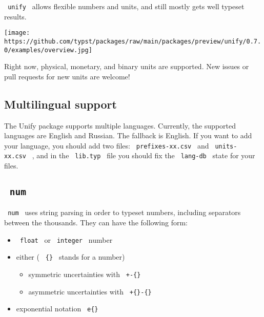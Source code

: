 \texttt{\ unify\ } allows flexible numbers and units, and still mostly
gets well typeset results.

\begin{Shaded}
\begin{Highlighting}[]

\end{Highlighting}
\end{Shaded}

\texttt{[image: https://github.com/typst/packages/raw/main/packages/preview/unify/0.7.0/examples/overview.jpg]}

Right now, physical, monetary, and binary units are supported. New
issues or pull requests for new units are welcome!

\subsection{Multilingual support}\label{multilingual-support}

The Unify package supports multiple languages. Currently, the supported
languages are English and Russian. The fallback is English. If you want
to add your language, you should add two files:
\texttt{\ prefixes-xx.csv\ } and \texttt{\ units-xx.csv\ } , and in the
\texttt{\ lib.typ\ } file you should fix the \texttt{\ lang-db\ } state
for your files.

\subsection{\texorpdfstring{\texttt{\ num\ }}{ num }}\label{num}

\texttt{\ num\ } uses string parsing in order to typeset numbers,
including separators between the thousands. They can have the following
form:

\begin{itemize}
\tightlist
\item
  \texttt{\ float\ } or \texttt{\ integer\ } number
\item
  either ( \texttt{\ \{\}\ } stands for a number)

  \begin{itemize}
  \tightlist
  \item
    symmetric uncertainties with \texttt{\ +-\{\}\ }
  \item
    asymmetric uncertainties with \texttt{\ +\{\}-\{\}\ }
  \end{itemize}
\item
  exponential notation \texttt{\ e\{\}\ }
\end{itemize}

